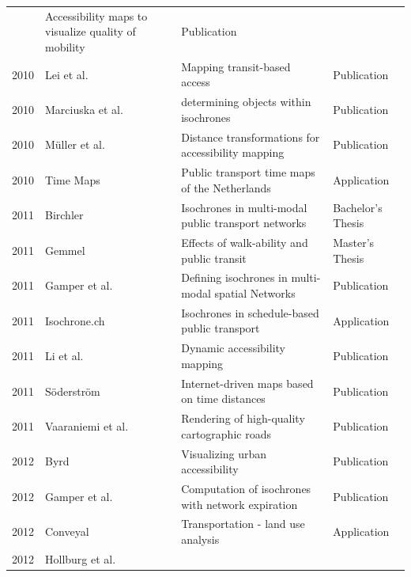 \begin{table}[htp]
\begin{tabular}{r|l|l|l}
        & Accessibility maps to visualize quality of mobility
        & Publication \\
      2010
        & Lei et al. \cite{lei2010mapping}
        & Mapping transit-based access
        & Publication \\
      2010
        & Marciuska et al. \cite{marciuska2010determining}
        & determining objects within isochrones
        & Publication \\
      2010
        & Müller et al. \cite{Mueller2010}
        & Distance transformations for accessibility mapping
        & Publication \\
      2010
        & Time Maps \cite{TimeMaps}
        & Public transport time maps of the Netherlands
        & Application \\
      2011
        & Birchler \cite{birchler2011computing}
        & Isochrones in multi-modal public transport networks
        & Bachelor's Thesis \\
      2011
        & Gemmel \cite{gemmel2012hedonic}
        & Effects of walk-ability and public transit
        & Master's Thesis \\
      2011
        & Gamper et al. \cite{gamper2011defining}
        & Defining isochrones in multi-modal spatial Networks
        & Publication \\
      2011
        & Isochrone.ch \cite{IsochroneCh}
        & Isochrones in schedule-based public transport
        & Application \\
      2011
        & Li et al. \cite{li2011dynamic}
        & Dynamic accessibility mapping
        & Publication \\
      2011
        & Söderström \cite{soderstrom2011personal}
        & Internet-driven maps based on time distances
        & Publication \\
      2011
        & Vaaraniemi et al. \cite{Vaaraniemi2011}
        & Rendering of high-quality cartographic roads
        & Publication \\
      2012
        & Byrd \cite{Byrd2012}
        & Visualizing urban accessibility
        & Publication \\
      2012
        & Gamper et al. \cite{gamper2012scalable}
        & Computation of isochrones with network expiration
        & Publication \\
      2012
        & Conveyal \cite{Conveyal}
        & Transportation - land use analysis
        & Application \\
      2012
        & Hollburg et al. \cite{hollburghier}

\end{tabular}
\end{table}
